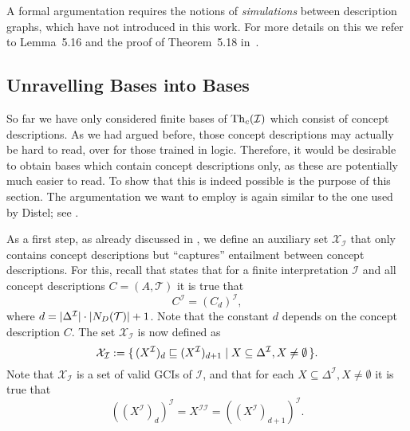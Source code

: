 A formal argumentation requires the notions of \emph{simulations} between \EL description
graphs, which have not introduced in this work.  For more details on this we refer to
Lemma~5.16 and the proof of Theorem~5.18 in~\cite{Diss-Felix}.

\subsection{Unravelling \ELgfpbot Bases into \ELbot Bases}
\label{sec:unrav-elgfpb-bases}

So far we have only considered finite bases of $\operatorname{Th}_c(\mathcal{I})$ which consist of
\ELgfpbot concept descriptions.  As we had argued before, those concept descriptions may
actually be hard to read, over for those trained in logic.  Therefore, it would be
desirable to obtain bases which contain \ELbot concept descriptions only, as these are
potentially much easier to read.  To show that this is indeed possible is the purpose of
this section.  The argumentation we want to employ is again similar to the one used by
Distel; see .

As a first step, as already discussed in , we define an auxiliary
set $\mathcal{X}_{\mathcal{I}}$ that only contains \ELbot concept descriptions but
``captures'' entailment between \ELgfpbot concept descriptions.  For this, recall that
 states that for a finite interpretation $\mathcal{I}$ and all
\ELgfpbot concept descriptions $C = (A, \mathcal{T})$ it is true that
\begin{equation*}
  C^{\mathcal{I}} = (C_d)^{\mathcal{I}},
\end{equation*}
where $d = \lvert \Delta^{\mathcal{I}} \rvert \cdot \lvert N_D(\mathcal{T}) \rvert + 1$.  Note that
the constant $d$ depends on the concept description $C$.  The set
$\mathcal{X}_{\mathcal{I}}$ is now defined as
\begin{equation*}
  \mathcal{X}_{\mathcal{I}} := {\{\, (X^{\mathcal{I}})_d \sqsubseteq
    (X^{\mathcal{I}})_{d+1} \mid X \subseteq \Delta^{\mathcal{I}}, X \neq \emptyset \,\}}.
\end{equation*}
Note that $\mathcal{X}_{\mathcal{I}}$ is a set of valid GCIs of $\mathcal{I}$, and that
for each $X \subseteq \Delta^{\mathcal{I}}, X \neq \emptyset$ it is true that
\begin{equation*}
  ((X^{\mathcal{I}})_d)^{\mathcal{I}} = X^{\mathcal{I}\mathcal{I}} = ((X^{\mathcal{I}})_{d+1})^{\mathcal{I}}.
\end{equation*}

